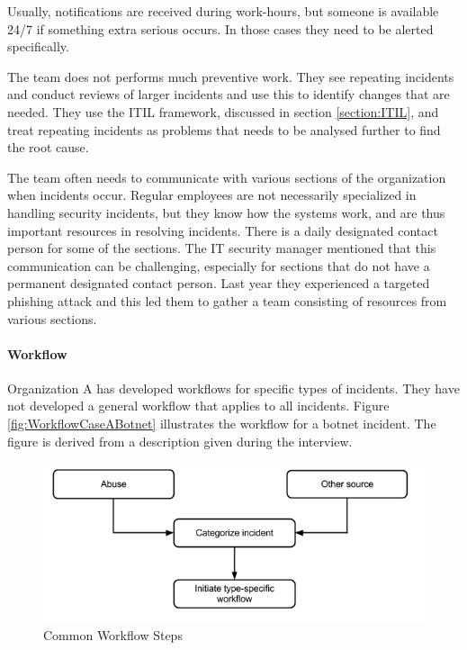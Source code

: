 Usually, notifications are received during work-hours, but someone is available 24/7 if something extra serious occurs. In those cases they need to be alerted specifically.

The team does not performs much preventive work. They see repeating incidents and conduct reviews of larger incidents and use this to identify changes that are needed. They use the \ac{ITIL} framework, discussed in section \ref{section:ITIL}, and treat repeating incidents as problems that needs to be analysed further to find the root cause.

The team often needs to communicate with various sections of the organization when incidents occur. Regular employees are not necessarily specialized in handling security incidents, but they know how the systems work, and are thus important resources in resolving incidents. There is a daily designated contact person for some of the sections. The IT security manager mentioned that this communication can be challenging, especially for sections that do not have a permanent designated contact person. Last year they experienced a targeted phishing attack and this led them to gather a team consisting of resources from various sections.

\paragraph{Workflow}
Organization A has developed workflows for specific types of incidents. They have not developed a general workflow that applies to all incidents. Figure \ref{fig:WorkflowCaseABotnet} illustrates the workflow for a botnet incident. The figure is derived from a description given during the interview. 

\begin{figure}[H]
\begin{center}
\includegraphics[scale=0.53]{WorkflowCaseAGeneral.png}
\caption[Common Workflow Steps, Case A]{Common Workflow Steps}
\label{fig:WorkflowCaseAGeneral}
\end{center}
\end{figure}

